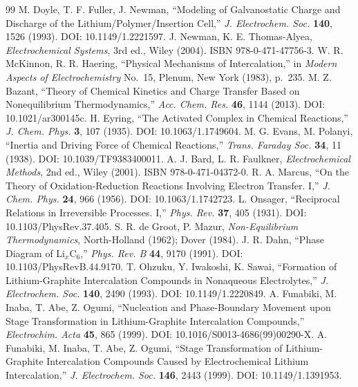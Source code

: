 \documentclass[11pt,a4paper]{article}
\begin{document}
\begin{thebibliography}{99}
 M. Doyle, T. F. Fuller, J. Newman, ``Modeling of Galvanostatic Charge and Discharge
  of the Lithium/Polymer/Insertion Cell,'' \emph{J. Electrochem. Soc.} \textbf{140}, 1526 (1993).
  DOI: 10.1149/1.2221597.
 J. Newman, K. E. Thomas-Alyea, \emph{Electrochemical Systems}, 3rd ed., Wiley (2004).
  ISBN 978-0-471-47756-3.
 W. R. McKinnon, R. R. Haering, ``Physical Mechanisms of Intercalation,'' in
  \emph{Modern Aspects of Electrochemistry} No.~15, Plenum, New York (1983), p.~235.
 M. Z. Bazant, ``Theory of Chemical Kinetics and Charge Transfer Based on
  Nonequilibrium Thermodynamics,'' \emph{Acc. Chem. Res.} \textbf{46}, 1144 (2013).
  DOI: 10.1021/ar300145c.
 H. Eyring, ``The Activated Complex in Chemical Reactions,'' \emph{J. Chem. Phys.}
  \textbf{3}, 107 (1935). DOI: 10.1063/1.1749604.
 M. G. Evans, M. Polanyi, ``Inertia and Driving Force of Chemical Reactions,''
  \emph{Trans. Faraday Soc.} \textbf{34}, 11 (1938). DOI: 10.1039/TF9383400011.
 A. J. Bard, L. R. Faulkner, \emph{Electrochemical Methods}, 2nd ed., Wiley (2001).
  ISBN 978-0-471-04372-0.
 R. A. Marcus, ``On the Theory of Oxidation-Reduction Reactions Involving Electron
  Transfer. I,'' \emph{J. Chem. Phys.} \textbf{24}, 966 (1956). DOI: 10.1063/1.1742723.
 L. Onsager, ``Reciprocal Relations in Irreversible Processes. I,'' \emph{Phys. Rev.}
  \textbf{37}, 405 (1931). DOI: 10.1103/PhysRev.37.405.
 S. R. de Groot, P. Mazur, \emph{Non-Equilibrium Thermodynamics},
  North-Holland (1962); Dover (1984).
 J. R. Dahn, ``Phase Diagram of Li$_x$C$_6$,'' \emph{Phys. Rev. B} \textbf{44}, 9170
  (1991). DOI: 10.1103/PhysRevB.44.9170.
 T. Ohzuku, Y. Iwakoshi, K. Sawai, ``Formation of Lithium-Graphite Intercalation Compounds in Nonaqueous Electrolytes,''
  \emph{J. Electrochem. Soc.} \textbf{140}, 2490 (1993). DOI: 10.1149/1.2220849.
 A. Funabiki, M. Inaba, T. Abe, Z. Ogumi, ``Nucleation and Phase-Boundary
  Movement upon Stage Transformation in Lithium-Graphite Intercalation Compounds,''
  \emph{Electrochim. Acta} \textbf{45}, 865 (1999). DOI: 10.1016/S0013-4686(99)00290-X.
 A. Funabiki, M. Inaba, T. Abe, Z. Ogumi, ``Stage Transformation of
  Lithium-Graphite Intercalation Compounds Caused by Electrochemical Lithium Intercalation,''
  \emph{J. Electrochem. Soc.} \textbf{146}, 2443 (1999). DOI: 10.1149/1.1391953.

\end{thebibliography}
\end{document}
